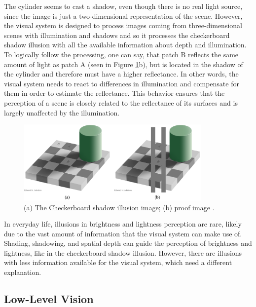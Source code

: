 The cylinder seems to cast a shadow, even though there is no real light source, since the
image is just a two-dimensional representation of the scene. However, the visual system is
designed to process images coming from three-dimensional scenes with illumination and
shadows and so it processes the checkerboard shadow illusion with all the available
information about depth and illumination. To logically follow the processing, one can say,
that patch B reflects the same amount of light as patch A (seen in Figure
\ref*{fig:figure3}b), but is located in the shadow of the cylinder and therefore must have
a higher reflectance. In other words, the visual system needs to react to differences in
illumination and compensate for them in order to estimate the reflectance. This behavior
ensures that the perception of a scene is closely related to the reflectance of its
surfaces and is largely unaffected by the illumination. 

\begin{figure}[H]
    \centering
    \centering
    \includegraphics[width=0.85\textwidth]{media/checkershadow_double_full_.png}
    \begin{minipage}{0.8\textwidth}
    \caption[Checkerboard shadow illusion]{(a) The Checkerboard shadow illusion image; (b)
    proof image \parencite{adelson1995checkershadow}.}
    \label{fig:figure3}
    \end{minipage}
\end{figure}

In everyday life, illusions in brightness and lightness perception are rare, likely due to
the vast amount of information that the visual system can make use of. Shading, shadowing,
and spatial depth can guide the perception of brightness and lightness, like in the
checkerboard shadow illusion. However, there are illusions with less information available
for the visual system, which need a different explanation.

\subsection{Low-Level Vision}

